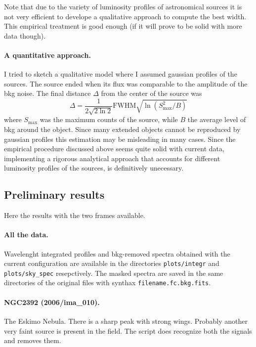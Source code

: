 \documentclass{article}
\begin{document}
Note that due to the variety of luminosity profiles of astronomical sources it is not very efficient to develope a qualitative approach to compute the best width. This empirical treatment is good enough (if it will prove to be solid with more data though).

\paragraph{A quantitative approach.} I tried to sketch a qualitative model where I assumed gaussian profiles of the sources. The source ended when its flux was comparable to the amplitude of the bkg noise. The final distance $\Delta$ from the center of the source was
\[\Delta = \frac{1}{2\sqrt{2\ln 2}}\text{FWHM}\sqrt{\ln(S_\text{max}^2/B)}   \]
where $S_\text{max}$ was the maximum counts of the source, while $B$ the average level of bkg around the object. Since many extended objects cannot be reproduced by gaussian profiles this estimation may be misleading in many cases. Since the empirical procedure discussed above seems quite solid with current data, implementing a rigorous analytical approach that accounts for different luminosity profiles of the sources, is definitively unecessary.


\subsection{Preliminary results}
Here the results with the two frames available.

\paragraph{All the data.} Wavelenght integrated profiles and bkg-removed spectra obtained with the current configuration are available in the directories \texttt{plots/integr} and \texttt{plots/sky\_spec} resepctively. The masked spectra are saved in the same directories of the original files with synthax \texttt{filename.fc.bkg.fits}.

\paragraph{NGC2392 (2006/ima\_010).} The Eskimo Nebula. There is a sharp peak with strong wings. Probably another very faint source is present in the field. The script does recognize both the signals and removes them.
\end{document}
